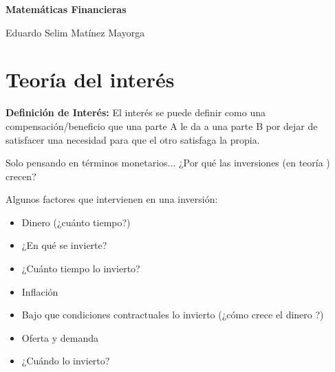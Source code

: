 





\begin{titlingpage} %

    \raggedleft %
	
	\vspace*{\baselineskip} %
	
	\vspace*{0.25\textheight} %
	
    
    \vspace*{0.1\textheight}

    {\Huge{\textbf{Matemáticas Financieras}}}\\[\baselineskip] %
    \vspace*{0.1\textheight}

    
    {\Large Eduardo Selim Matínez Mayorga}\\[\baselineskip]
	
	\vfill

\end{titlingpage}

\thispagestyle{empty}

\chapter*{Teoría del interés} %

\textbf{Definición de Interés:} El interés se puede definir como una compensación/beneficio que una parte A le da a una parte B por dejar de satisfacer una necesidad para que el otro satisfaga la propia.

Solo pensando en términos monetarios... ¿Por qué las inversiones (en teoría ) crecen?

Algunos factores que intervienen en una inversión:

\begin{itemize}
\item Dinero (¿cuánto tiempo?)
\item ¿En qué se invierte?
\item ¿Cuánto tiempo lo invierto?
\item Inflación
\item Bajo que condiciones contractuales lo invierto (¿cómo crece el dinero ?)
\item Oferta y demanda
\item ¿Cuándo lo invierto?
\end{itemize}

